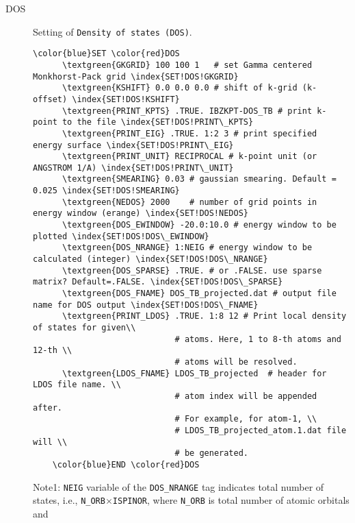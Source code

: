\documentclass[a4paper,12pt]{scrartcl}
\makeatletter
\def\namedlabel#1#2{\begingroup
    #2%
    \def\@currentlabel{#2}%
    \phantomsection\label{#1}\endgroup
}
\newcommand{\textgreen}[1]{\textcolor{green!50!black}{\texttt{#1}}}
\makeatother
\begin{document}
\begin{description}
    \item[\namedlabel{tag:DOS}{DOS}] 
        Setting of \texttt{Density of states (DOS)}.

 \begin{Verbatim}[commandchars=\\\{\},gobble=4, frame=single, framesep=2mm, 
    label= DOS setup example,
    labelposition=bottomline]
    \color{blue}SET \color{red}DOS
      \textgreen{GKGRID} 100 100 1   # set Gamma centered Monkhorst-Pack grid \index{SET!DOS!GKGRID}
      \textgreen{KSHIFT} 0.0 0.0 0.0 # shift of k-grid (k-offset) \index{SET!DOS!KSHIFT}
      \textgreen{PRINT_KPTS} .TRUE. IBZKPT-DOS_TB # print k-point to the file \index{SET!DOS!PRINT\_KPTS}
      \textgreen{PRINT_EIG} .TRUE. 1:2 3 # print specified energy surface \index{SET!DOS!PRINT\_EIG}
      \textgreen{PRINT_UNIT} RECIPROCAL # k-point unit (or ANGSTROM 1/A) \index{SET!DOS!PRINT\_UNIT}
      \textgreen{SMEARING} 0.03 # gaussian smearing. Default = 0.025 \index{SET!DOS!SMEARING}
      \textgreen{NEDOS} 2000    # number of grid points in energy window (erange) \index{SET!DOS!NEDOS}
      \textgreen{DOS_EWINDOW} -20.0:10.0 # energy window to be plotted \index{SET!DOS!DOS\_EWINDOW}
      \textgreen{DOS_NRANGE} 1:NEIG # energy window to be calculated (integer) \index{SET!DOS!DOS\_NRANGE}
      \textgreen{DOS_SPARSE} .TRUE. # or .FALSE. use sparse matrix? Default=.FALSE. \index{SET!DOS!DOS\_SPARSE}
      \textgreen{DOS_FNAME} DOS_TB_projected.dat # output file name for DOS output \index{SET!DOS!DOS\_FNAME}
      \textgreen{PRINT_LDOS} .TRUE. 1:8 12 # Print local density of states for given\\
                             # atoms. Here, 1 to 8-th atoms and 12-th \\
                             # atoms will be resolved.
      \textgreen{LDOS_FNAME} LDOS_TB_projected  # header for LDOS file name. \\
                             # atom index will be appended after.   
                             # For example, for atom-1, \\
                             # LDOS_TB_projected_atom.1.dat file will \\
                             # be generated.       
    \color{blue}END \color{red}DOS
 \end{Verbatim}
Note1: \texttt{NEIG} variable of the \texttt{DOS\_NRANGE} tag indicates
total number of states, i.e., \texttt{N\_ORB}$\times$\texttt{ISPINOR}, 
where \texttt{N\_ORB} is total number of atomic orbitals and 

\end{description}
\end{document}
